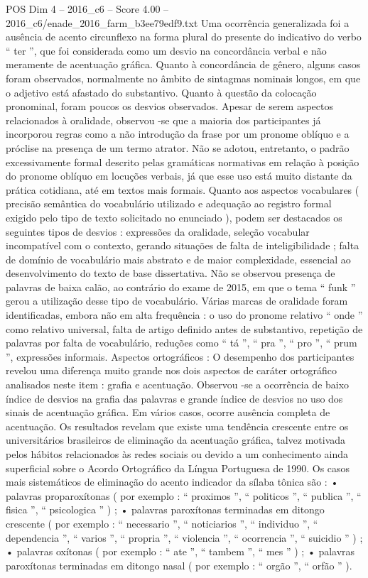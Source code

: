 \begin{textsample}{POS Dim 4 – 2016\_c6 – Score 4.00 – 2016\_c6/enade\_2016\_farm\_b3ee79edf9.txt}
Uma ocorrência generalizada foi a ausência de acento circunflexo na forma plural do presente do indicativo do verbo “ ter ”, que foi considerada como um desvio na concordância verbal e não meramente de acentuação gráfica.
Quanto à concordância de gênero, alguns casos foram observados, normalmente no âmbito de sintagmas nominais longos, em que o adjetivo está afastado do substantivo.
Quanto à questão da colocação pronominal, foram poucos os desvios observados.
Apesar de serem aspectos relacionados à oralidade, observou -se que a maioria dos participantes já incorporou regras como a não introdução da frase por um pronome oblíquo e a próclise na presença de um termo atrator.
Não se adotou, entretanto, o padrão excessivamente formal descrito pelas gramáticas normativas em relação à posição do pronome oblíquo em locuções verbais, já que esse uso está muito distante da prática cotidiana, até em textos mais formais.
Quanto aos aspectos vocabulares ( precisão semântica do vocabulário utilizado e adequação ao registro formal exigido pelo tipo de texto solicitado no enunciado ), podem ser destacados os seguintes tipos de desvios : expressões da oralidade, seleção vocabular incompatível com o contexto, gerando situações de falta de inteligibilidade ; falta de domínio de vocabulário mais abstrato e de maior complexidade, essencial ao desenvolvimento do texto de base dissertativa.
Não se observou presença de palavras de baixa calão, ao contrário do exame de 2015, em que o tema “ funk ” gerou a utilização desse tipo de vocabulário.
Várias marcas de oralidade foram identificadas, embora não em alta frequência : o uso do pronome relativo “ onde ” como relativo universal, falta de artigo definido antes de substantivo, repetição de palavras por falta de vocabulário, reduções como “ tá ”, “ pra ”, “ pro ”, “ prum ”, expressões informais.
Aspectos ortográficos : O desempenho dos participantes revelou uma diferença muito grande nos dois aspectos de caráter ortográfico analisados neste item : grafia e acentuação.
Observou -se a ocorrência de baixo índice de desvios na grafia das palavras e grande índice de desvios no uso dos sinais de acentuação gráfica.
Em vários casos, ocorre ausência completa de acentuação.
Os resultados revelam que existe uma tendência crescente entre os universitários brasileiros de eliminação da acentuação gráfica, talvez motivada pelos hábitos relacionados às redes sociais ou devido a um conhecimento ainda superficial sobre o Acordo Ortográfico da Língua Portuguesa de 1990.
Os casos mais sistemáticos de eliminação do acento indicador da sílaba tônica são : • palavras proparoxítonas ( por exemplo : “ proximos ”, “ politicos ”, “ publica ”, “ fisica ”, “ psicologica ” ) ; • palavras paroxítonas terminadas em ditongo crescente ( por exemplo : “ necessario ”, “ noticiarios ”, “ individuo ”, “ dependencia ”, “ varios ”, “ propria ”, “ violencia ”, “ ocorrencia ”, “ suicidio ” ) ; • palavras oxítonas ( por exemplo : “ ate ”, “ tambem ”, “ mes ” ) ; • palavras paroxítonas terminadas em ditongo nasal ( por exemplo : “ orgão ”, “ orfão ” ).

\end{textsample}
